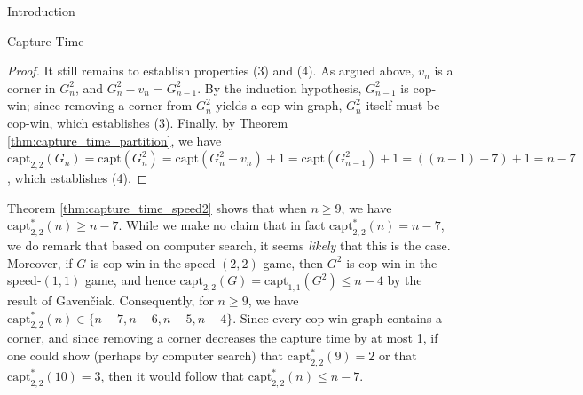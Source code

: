 \documentclass[12pt]{amsart}
\newtheorem{proposition}[lemma]{Proposition}
\theoremstyle{definition}
\newcommand{\capt}[1]{\mathrm{capt}_{#1,#1}}
\begin{document}
\begin{section}{Introduction}
\begin{section}{Capture Time}
\begin{proof}
    It still remains to establish properties (3) and (4).  As argued above, $v_n$ is a corner in $G_n^2$, and $G_n^2-v_n = G_{n-1}^2$.  By the induction hypothesis, $G_{n-1}^2$ is cop-win; since removing a corner from $G_n^2$ yields a cop-win graph, $G_n^2$ itself must be cop-win, which establishes (3).  Finally, by Theorem \ref{thm:capture_time_partition}, we have $\capt{2}(G_n)=\mathrm{capt}(G_n^2)=\mathrm{capt}(G_n^2-v_n)+1=\mathrm{capt}(G_{n-1}^2)+1=\left((n-1)-7\right)+1=n-7$, which establishes (4).
\end{proof}

Theorem \ref{thm:capture_time_speed2} shows that when $n \ge 9$, we have $\capt{2}^*(n) \ge n-7$.  While we make no claim that in fact $\capt{2}^*(n) = n-7$, we do remark that based on computer search, it seems \textit{likely} that this is the case.  Moreover, if $G$ is cop-win in the speed-$(2,2)$ game, then $G^2$ is cop-win in the speed-$(1,1)$ game, and hence $\capt{2}(G) = \capt{1}(G^2) \le n-4$ by the result of Gaven\v{c}iak.  Consequently, for $n \ge 9$, we have $\capt{2}^*(n) \in \{n-7, n-6, n-5, n-4\}$.  Since every cop-win graph contains a corner, and since removing a corner decreases the capture time by at most 1, if one could show (perhaps by computer search) that $\capt{2}^*(9) = 2$ or that $\capt{2}^*(10) = 3$, then it would follow that $\capt{2}^*(n) \le n-7$.






\end{section}
\end{section}
\end{document}
